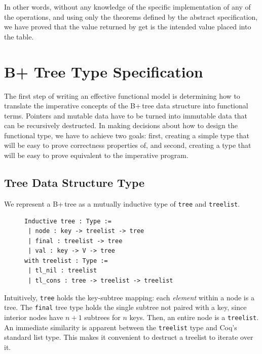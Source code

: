 \documentclass[a4paper,12pt]{article}
\begin{document}
In other words, without any knowledge of the specific implementation of any of the operations, and using only the theorems defined by the abstract specification, we have proved that the value returned by get is the intended value placed into the table.

\clearpage

\section{B+ Tree Type Specification} \label{sec:typedef}

The first step of writing an effective functional model is determining how to translate the imperative concepts of the B+\,tree data structure into functional terms. Pointers and mutable data have to be turned into immutable data that can be recursively destructed. In making decisions about how to design the functional type, we have to achieve two goals: first, creating a simple type that will be easy to prove correctness properties of, and second, creating a type that will be easy to prove equivalent to the imperative program.

\subsection{Tree Data Structure Type}

We represent a B+\,tree as a mutually inductive type of \texttt{tree} and \texttt{treelist}.

\begin{figure}[h]
\begin{singlespace}
\begin{verbatim}
Inductive tree : Type :=
 | node : key -> treelist -> tree
 | final : treelist -> tree
 | val : key -> V -> tree
with treelist : Type :=
 | tl_nil : treelist
 | tl_cons : tree -> treelist -> treelist
\end{verbatim}
\end{singlespace}
\end{figure}

Intuitively, \texttt{tree} holds the key-subtree mapping: each \textit{element} within a node is a tree. The \texttt{final} tree type holds the single subtree not paired with a key, since interior nodes have $n+1$ subtrees for $n$ keys. Then, an entire node is a \texttt{treelist}. An immediate similarity is apparent between the \texttt{treelist} type and Coq’s standard list type. This makes it convenient to destruct a treelist to iterate over it.
\end{document}
